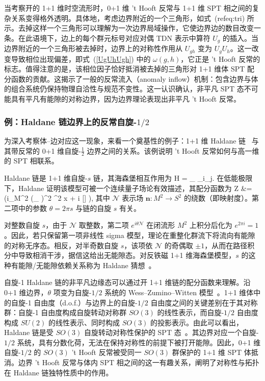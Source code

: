当考察开的 1+1 维时空流形时，0+1 维 't Hooft 反常与 1+1 维 SPT 相之间的复杂关系变得格外透明。具体地，考虑边界附近的一个三角形，如式~(ref{eq:tri}) 所示。去掉这样一个三角形可以理解为一次边界局域操作，它使边界边的数目改变一条。在此语境下，边上的每个群元标号对应对偶 TDN 表示中算符 $U_g$ 的插入。当边界附近的一个三角形被去掉时，边界上的对称性作用从 $U_{gh}$ 变为 $U_gU_h$。这一改变导致相位出现偏差，即式~(\ref{UgUhUgh}) 中的 $\omega(g,h)$，它正是 't Hooft 反常的标志。值得注意的是，该相位因子恰好抵消被去掉的三角形对 1+1 维体 SPT 配分函数的贡献。这揭示了一般的反常流入（anomaly inflow）机制：包含边界与体的组合系统仍保持物理自洽性与规范不变性。这一认识确认，非平凡 SPT 态不可能具有平凡有能隙的对称边界，因为边界理论表现出非平凡 't Hooft 反常。

\subsubsection{例：Haldane 链边界上的反常自旋-$1/2$}

为深入考察体--边对应这一现象，来看一个奠基性的例子：1+1 维 Haldane 链~\cite{haldane1983nonlinear,haldane1983continuum} 与其带反常的 0+1 维自旋-$\frac{1}{2}$ 边界之间的关系。该例说明 't Hooft 反常如何与高一维的 SPT 相联系。

Haldane 链是 1+1 维自旋-$s$ 链，其海森堡相互作用为
\be\label{eq:Haldane}  H = \sum_{} _i\cdot {}_j. \ee
在低能极限下，Haldane 证明该模型可被一个连续量子场论有效描述，其配分函数为
\be\ba 
Z &= \int {}  \exp(i\int_{M^2} (\ptl_\mu {} )^2 \dd^2 x + i  \theta {}[]  ),
\ea\ee
其中 $\mathcal{N}$ 表示场 $\mathbf{n}: M^2 \rightarrow S^2$ 的绕数（即映射度）。第二项中的参数 $\theta=2\pi s$ 与链的自旋 $s$ 有关。

对整数自旋 $s$，由于 $\mathcal{N}$ 取整数，第二项 $e^{i\theta \mathcal N}$ 在闭流形 $M^2$ 上积分后化为 $e^{2\pi i} = 1$。因此，若只保留第一项非线性 sigma 模型，理论在重整化群流下将流向有能隙的对称无序态。相反，对半奇数自旋 $s$，该项依 $\mathcal{N}$ 的奇偶取 $\pm 1$，从而在路径积分中导致相消干涉，据信这给出无能隙态。对反铁磁 1+1 维海森堡模型，$s$ 的这种有能隙/无能隙依赖关系称为 Haldane 猜想~\cite{haldane1983nonlinear,haldane1983continuum}。

自旋-1 Haldane 链的非平凡边缘态可以通过开 1+1 维链的配分函数来理解。沿 0+1 维边界，$\theta$ 项变为自旋-$1/2$ 系统的 Wess--Zumino--Witten 模型~\cite{ng1994edge}。1+1 维体中的自旋-1 自由度（d.o.f.）与边界上的自旋-$1/2$ 自由度之间的关键差别在于其对称群：自旋-1 自由度构成自旋转动对称群 $SO(3)$ 的线性表示，而自旋-$1/2$ 自由度构成 $SU(2)$ 的线性表示、同时构成 $SO(3)$ 的投影表示。由此可以看出，Haldane 链是受 $SO(3)$ 自旋转动对称性保护的 SPT 态~\cite{gu2009tensor}。其边界对应一个自旋-$1/2$ 系统，具有分数化荷，无法在保持对称性的前提下被打开能隙。因此，0+1 维自旋-$1/2$ 的 $SO(3)$ 't Hooft 反常被受同一 $SO(3)$ 群保护的 1+1 维 SPT 体抵消。边界 't Hooft 反常与体内 SPT 相之间的这一有趣关系，阐明了对称性与拓扑在 Haldane 链独特性质中的作用。

